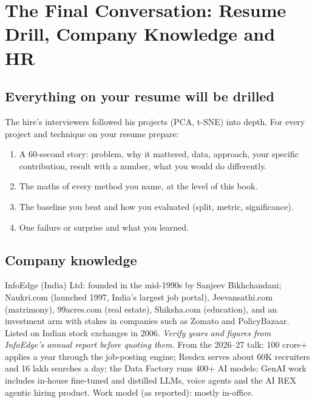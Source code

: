 \chapter{The Final Conversation: Resume Drill, Company Knowledge and HR}

\section{Everything on your resume will be drilled}
The hire's interviewers followed his projects (PCA, t-SNE) into depth. For every project and technique on your resume prepare:
\begin{enumerate}
\item A 60-second story: problem, why it mattered, data, approach, your specific contribution, result with a number, what you would do differently.
\item The maths of every method you name, at the level of this book.
\item The baseline you beat and how you evaluated (split, metric, significance).
\item One failure or surprise and what you learned.
\end{enumerate}

\section{Company knowledge}
InfoEdge (India) Ltd: founded in the mid-1990s by Sanjeev Bikhchandani; Naukri.com (launched 1997, India's largest job portal), Jeevansathi.com (matrimony), 99acres.com
(real estate), Shiksha.com (education), and an investment arm with stakes in companies such as Zomato and PolicyBazaar. Listed on Indian stock exchanges in 2006. \emph{Verify
years and figures from InfoEdge's annual report before quoting them.} From the 2026--27 talk: 100 crore+ applies a year through the job-posting engine; Resdex serves about 60K
recruiters and 16 lakh searches a day; the Data Factory runs 400+ AI models; GenAI work includes in-house fine-tuned and distilled LLMs, voice agents and the AI REX agentic hiring
product. Work model (as reported): mostly in-office.

